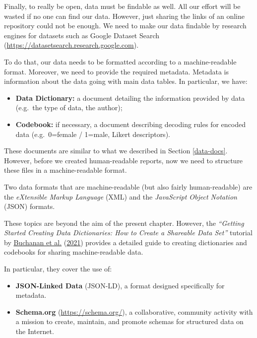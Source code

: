 \documentclass[
  11pt,
]{book}
\providecommand{\tightlist}{%
  \setlength{\itemsep}{0pt}\setlength{\parskip}{0pt}}
\begin{document}
Finally, to really be open, data must be findable as well. All our effort will be wasted if no one can find our data. However, just sharing the links of an online repository could not be enough. We need to make our data findable by research engines for datasets such as Google Dataset Search (\url{https://datasetsearch.research.google.com}).

To do that, our data needs to be formatted according to a machine-readable format. Moreover, we need to provide the required metadata. Metadata is information about the data going with main data tables. In particular, we have:

\begin{itemize}
\tightlist
\item
  \textbf{Data Dictionary:} a document detailing the information provided by data (e.g.~the type of data, the author);
\item
  \textbf{Codebook:} if necessary, a document describing decoding rules for encoded data (e.g.~0=female / 1=male, Likert descriptors).
\end{itemize}

These documents are similar to what we described in Section \ref{data-docs}. However, before we created human-readable reports, now we need to structure these files in a machine-readable format.

Two data formats that are machine-readable (but also fairly human-readable) are the \emph{eXtensible Markup Language} (XML) and the \emph{JavaScript Object Notation} (JSON) formats.

These topics are beyond the aim of the present chapter. However, the \emph{``Getting Started Creating Data Dictionaries: How to Create a Shareable Data Set''} tutorial by \protect\hyperlink{ref-buchananGettingStartedCreating2021}{Buchanan et al.} (\protect\hyperlink{ref-buchananGettingStartedCreating2021}{2021}) provides a detailed guide to creating dictionaries and codebooks for sharing machine-readable data.

In particular, they cover the use of:

\begin{itemize}
\tightlist
\item
  \textbf{JSON-Linked Data} (JSON-LD), a format designed specifically for metadata.
\item
  \textbf{Schema.org} (\url{https://schema.org/}), a collaborative, community activity with a mission to create, maintain, and promote schemas for structured data on the Internet.
\end{itemize}
\end{document}
